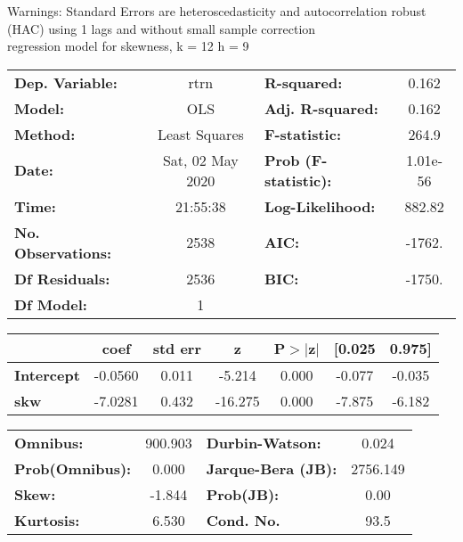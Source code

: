 Warnings: \newline
 [1] Standard Errors are heteroscedasticity and autocorrelation robust (HAC) using 1 lags and without small sample correction\\ 

regression model for skewness, k = 12 h = 9\begin{center}
\begin{tabular}{lclc}
\toprule
\textbf{Dep. Variable:}    &       rtrn       & \textbf{  R-squared:         } &     0.162   \\
\textbf{Model:}            &       OLS        & \textbf{  Adj. R-squared:    } &     0.162   \\
\textbf{Method:}           &  Least Squares   & \textbf{  F-statistic:       } &     264.9   \\
\textbf{Date:}             & Sat, 02 May 2020 & \textbf{  Prob (F-statistic):} &  1.01e-56   \\
\textbf{Time:}             &     21:55:38     & \textbf{  Log-Likelihood:    } &    882.82   \\
\textbf{No. Observations:} &        2538      & \textbf{  AIC:               } &    -1762.   \\
\textbf{Df Residuals:}     &        2536      & \textbf{  BIC:               } &    -1750.   \\
\textbf{Df Model:}         &           1      & \textbf{                     } &             \\
\bottomrule
\end{tabular}
\begin{tabular}{lcccccc}
                   & \textbf{coef} & \textbf{std err} & \textbf{z} & \textbf{P$> |$z$|$} & \textbf{[0.025} & \textbf{0.975]}  \\
\midrule
\textbf{Intercept} &      -0.0560  &        0.011     &    -5.214  &         0.000        &       -0.077    &       -0.035     \\
\textbf{skw}       &      -7.0281  &        0.432     &   -16.275  &         0.000        &       -7.875    &       -6.182     \\
\bottomrule
\end{tabular}
\begin{tabular}{lclc}
\textbf{Omnibus:}       & 900.903 & \textbf{  Durbin-Watson:     } &    0.024  \\
\textbf{Prob(Omnibus):} &   0.000 & \textbf{  Jarque-Bera (JB):  } & 2756.149  \\
\textbf{Skew:}          &  -1.844 & \textbf{  Prob(JB):          } &     0.00  \\
\textbf{Kurtosis:}      &   6.530 & \textbf{  Cond. No.          } &     93.5  \\
\bottomrule
\end{tabular}
\end{center}

